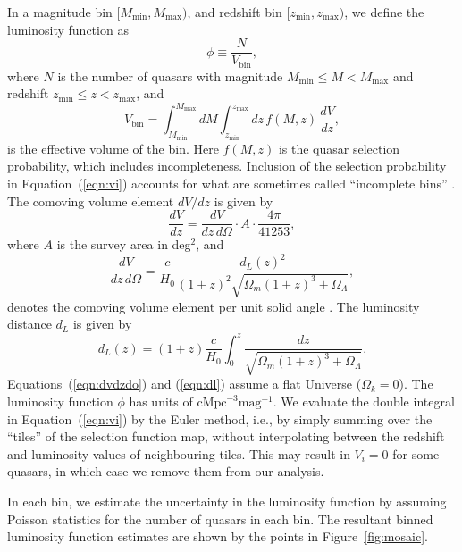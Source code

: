 \documentclass[fleqn,usenatbib]{mnras}
\begin{document}
In a magnitude bin $[M_\mathrm{min}, M_\mathrm{max})$, and redshift
  bin $[z_\mathrm{min}, z_\mathrm{max})$, we define the luminosity
    function as \citep{2000MNRAS.311..433P}
    \begin{equation}
      \phi \equiv \frac{N}{V_\mathrm{bin}},
    \end{equation}
    where $N$ is the number of quasars with magnitude
    $M_\mathrm{min}\leq M<M_\mathrm{max}$ and redshift
    $z_\mathrm{min}\leq z<z_\mathrm{max}$, and
    \begin{equation}
      V_\mathrm{bin} = \int_{M_\mathrm{min}}^{M_\mathrm{max}}dM\int_{z_\mathrm{min}}^{z_\mathrm{max}}dz\, f(M, z)\,\frac{dV}{dz},
      \label{eqn:vi}
    \end{equation}
    is the effective volume of the bin.  Here $f(M,z)$ is the quasar
    selection probability, which includes incompleteness.  Inclusion of
    the selection probability in Equation~(\ref{eqn:vi}) accounts for
    what are sometimes called ``incomplete bins''
    \citep{2006AJ....131.2766R}.  The comoving volume element $dV/dz$ is
    given by
    \begin{equation}
      \frac{dV}{dz}=\frac{dV}{dz\,d\Omega}\cdot A\cdot\frac{4\pi}{41253},
    \end{equation}
    where $A$ is the survey area in deg$^2$, and 
    \begin{equation}
      \frac{dV}{dz\,d\Omega}=\frac{c}{H_0}\frac{d_L(z)^2}{(1+z)^2\sqrt{\Omega_m(1+z)^3+\Omega_\Lambda}},
      \label{eqn:dvdzdo}
    \end{equation}
    denotes the comoving volume element per unit solid angle
    \citep{1999astro.ph..5116H}.  The luminosity distance $d_L$ is given
    by
    \begin{equation}
      d_L(z)=(1+z)\frac{c}{H_0}\int_0^z\frac{dz}{\sqrt{\Omega_m(1+z)^3+\Omega_\Lambda}}.
      \label{eqn:dl}
    \end{equation}
    Equations~(\ref{eqn:dvdzdo}) and (\ref{eqn:dl}) assume a flat
    Universe ($\Omega_k=0$).  The luminosity function $\phi$ has units
    of $\mathrm{cMpc}^{-3}\mathrm{mag}^{-1}$.  We evaluate the double
    integral in Equation~(\ref{eqn:vi}) by the Euler method, i.e., by
    simply summing over the ``tiles'' of the selection function map,
    without interpolating between the redshift and luminosity values of
    neighbouring tiles.  This may result in $V_i=0$ for some quasars, in
    which case we remove them from our analysis.

    In each bin, we estimate the uncertainty in the luminosity function
    by assuming Poisson statistics \citep{1986ApJ...303..336G} for the
    number of quasars in each bin.  The resultant binned luminosity
    function estimates are shown by the points in
    Figure~\ref{fig:mosaic}.
\end{document}
